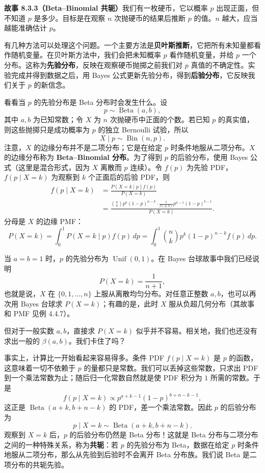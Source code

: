 \documentclass[UTF8, 12pt, fontset=fandol, oneside]{ctexart}
\begin{document}
\noindent\textbf{故事 8.3.3（Beta--Binomial 共轭）}\quad 我们有一枚硬币，它以概率 $p$ 出现正面，但不知道 $p$ 是多少。目标是在观察 $n$ 次抛硬币的结果后推断 $p$ 的值。$n$ 越大，应当越能准确估计 $p$。

有几种方法可以处理这个问题。一个主要方法是\textbf{贝叶斯推断}，它把所有未知量都看作随机变量。在贝叶斯方法中，我们会把未知概率 $p$ 看作随机变量，并给 $p$ 一个分布。这称为\textbf{先验分布}，反映在观察硬币抛掷之前我们对 $p$ 真值的不确定性。实验完成并得到数据之后，用 Bayes 公式更新先验分布，得到\textbf{后验分布}，它反映我们关于 $p$ 的新信念。

看看当 $p$ 的先验分布是 Beta 分布时会发生什么。设
\[
  p\sim\operatorname{Beta}(a,b),
\]
其中 $a,b$ 为已知常数；令 $X$ 为 $n$ 次抛硬币中正面的个数。若已知 $p$ 的真实值，则这些抛掷只是成功概率为 $p$ 的独立 Bernoulli 试验，所以
\[
  X\mid p\sim\operatorname{Bin}(n,p).
\]
注意，$X$ 的边缘分布并不是二项分布；它是在给定 $p$ 时条件地服从二项分布。$X$ 的边缘分布称为 \textbf{Beta--Binomial 分布}。为了得到 $p$ 的后验分布，使用 Bayes 公式（这里是混合形式，因为 $X$ 离散而 $p$ 连续）。令 $f(p)$ 为先验 PDF，$f(p\mid X=k)$ 为观察到 $k$ 个正面后的后验 PDF，则
\[
\begin{aligned}
  f(p\mid X=k)
  &=\frac{P(X=k\mid p)f(p)}{P(X=k)}\\
  &=\frac{{n\choose k}p^k(1-p)^{n-k}\cdot
  \frac{1}{\beta(a,b)}p^{a-1}(1-p)^{b-1}}{P(X=k)}.
\end{aligned}
\]
分母是 $X$ 的边缘 PMF：
\[
  P(X=k)=\int_0^1 P(X=k\mid p)f(p)\,dp
  =\int_0^1 {n\choose k}p^k(1-p)^{n-k}f(p)\,dp.
\]

当 $a=b=1$ 时，$p$ 的先验分布为 $\operatorname{Unif}(0,1)$。在 Bayes 台球故事中我们已经说明
\[
  P(X=k)=\frac{1}{n+1},
\]
也就是说，$X$ 在 $\{0,1,\ldots,n\}$ 上服从离散均匀分布。对任意正整数 $a,b$，也可以再次用 Bayes 台球求 $P(X=k)$；有趣的是，此时 $X$ 服从负超几何分布（其故事和 PMF 见例 4.4.7）。

但对于一般实数 $a,b$，直接求 $P(X=k)$ 似乎并不容易。相关地，我们也还没有求出一般的 $\beta(a,b)$。我们卡住了吗？

事实上，计算比一开始看起来容易得多。条件 PDF $f(p\mid X=k)$ 是 $p$ 的函数，这意味着一切不依赖于 $p$ 的量都只是常数。我们可以丢掉这些常数，只求出 PDF 到一个乘法常数为止；随后归一化常数自然就是使 PDF 积分为 $1$ 所需的常数。于是
\[
  f(p\mid X=k)\propto p^{a+k-1}(1-p)^{b+n-k-1},
\]
这正是 $\operatorname{Beta}(a+k,b+n-k)$ 的 PDF，差一个乘法常数。因此 $p$ 的后验分布为
\[
  p\mid X=k\sim\operatorname{Beta}(a+k,b+n-k).
\]
观察到 $X=k$ 后，$p$ 的后验分布仍然是 Beta 分布！这就是 Beta 分布与二项分布之间的一种特殊关系，称为\textbf{共轭}：若 $p$ 的先验分布为 Beta，数据在给定 $p$ 时条件地服从二项分布，那么从先验到后验时不会离开 Beta 分布族。我们说 Beta 是二项分布的共轭先验。
\end{document}
